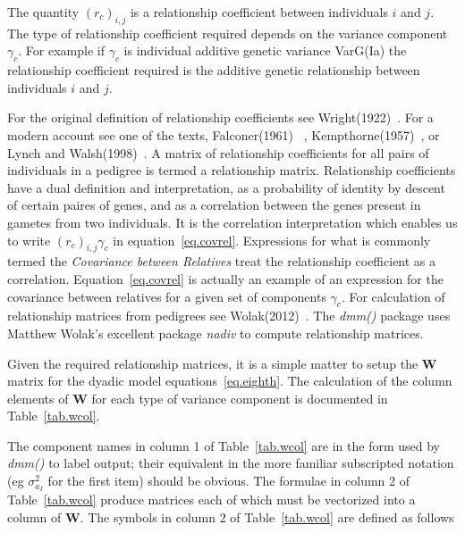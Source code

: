 \documentclass[titlepage]{article}  %
\begin{document}
The quantity $(r_{c})_{i,j}$ is a relationship coefficient between individuals $i$ and $j$. The type of relationship coefficient required depends on the variance component $\gamma_{c}$. For example if $\gamma_{c}$ is individual additive genetic variance VarG(Ia) the relationship coefficient required is the additive genetic relationship between individuals $i$ and $j$.

For the original definition of relationship coefficients see Wright(1922)~\cite{wrig:22}. For a modern account see one of the texts, Falconer(1961)~\cite{falc:61} , Kempthorne(1957)~\cite{kemp:57}, or Lynch and Walsh(1998)~\cite{lync:98}.  A matrix of relationship coefficients for all pairs of individuals in a pedigree is termed a relationship matrix. Relationship coefficients have a dual definition and interpretation, as a probability of identity by descent of certain paires of genes, and as a correlation between the genes present in gametes from two individuals. It is the correlation interpretation which enables us to write $(r_{c})_{i,j}\gamma_{c}$ in equation~\ref{eq.covrel}. Expressions for what is commonly termed the {\em Covariance between Relatives} treat the relationship coefficient as a correlation. Equation~\ref{eq.covrel} is actually an example of an expression for the covariance between relatives for a given set of components $\gamma_{c}$.  For calculation of relationship matrices from pedigrees see Wolak(2012)~\cite{wola:12}. The {\em dmm()} package uses Matthew Wolak's excellent package {\em nadiv} to compute relationship matrices. 

Given the required relationship matrices, it is a simple matter to setup the ${\bm W}$ matrix for the dyadic model equations~\ref{eq.eighth}. The calculation of the column elements of ${\bm W}$ for each type of variance component is documented in Table~\ref{tab.wcol}.



The component names in column 1 of Table~\ref{tab.wcol} are in the form used by {\em dmm()} to label output; their equivalent in the more familiar subscripted notation (eg $\sigma^{2}_{a_{I}}$ for the first item) should be obvious.
The formulae in column 2 of Table~\ref{tab.wcol} produce matrices each of which must be vectorized into a column of ${\bm W}$.
The symbols in column 2 of Table~\ref{tab.wcol} are defined as follows
\end{document}
